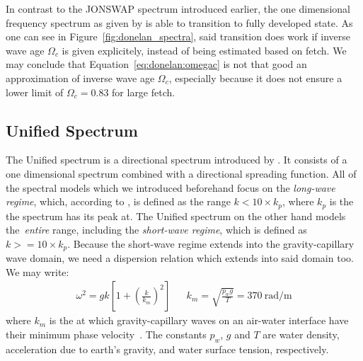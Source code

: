 %
In contrast to the JONSWAP spectrum introduced earlier, the one dimensional 
frequency spectrum as given by \citeauthor{article:Donelan1985} is able to
transition to fully developed state. As one can see in
Figure~\ref{fig:donelan_spectra}, said transition does work if inverse wave age
$\Omega_c$ is given explicitely, instead of being estimated based on fetch.
We may conclude that Equation~\ref{eq:donelan:omegac} is not that good an
approximation of inverse wave age $\Omega_c$, especially because it does not
ensure a lower limit of ${\Omega_c=0.83}$ for large fetch.
%
\subsection{Unified Spectrum}
\label{sec:unified_spectrum}
%
The Unified spectrum is a directional \wavenumber spectrum introduced by
\citet{article:Elfouhaily1997}. It consists of a one 
dimensional \wavenumber spectrum combined with a directional spreading 
function. All of the spectral models which we introduced beforehand focus on 
the \emph{long-wave regime}, which, according to \citeauthor{article:Elfouhaily1997},
is defined as the \wavenumber range $k < 10\times k_p$, where $k_p$ is
the \wavenumber the spectrum has its peak at. The Unified spectrum on the
other hand models the~\emph{entire} \wavenumber range, including the
\emph{short-wave regime}, which is defined as $k >= 10\times k_p$.
Because the short-wave regime extends into the gravity-capillary wave domain,
we need a dispersion relation which extends into said domain too.
We may write:
\begin{align*}
\omega^2 = gk\left[1 + \left(\frac{k}{k_m}\right)^2\right] &&
k_m = \sqrt{\frac{p_w g}{T}} = \SI{370}{\radian\per\meter}
\end{align*}
where $k_m$ is the \wavenumber at which gravity-capillary waves on an air-water
interface have their minimum phase velocity~\citep{lamb:1945}.
The constants $p_w$, $g$ and $T$ are water density, acceleration due to
earth's gravity, and water surface tension, respectively.

